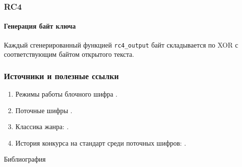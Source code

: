 \begin{frame}[fragile]
    \frametitle{RC4}
    \framesubtitle{Генерация байт ключа}

Каждый сгенерированный функцией \verb"rc4_output" байт складывается по XOR с соответствующим байтом открытого текста.
\begin{semiverbatim}
\end{semiverbatim}
\end{frame}

\appendix


\begin{frame}
\frametitle{Источники и полезные ссылки}
    \begin{enumerate}
        \item Режимы работы блочного шифра \cite{bib:mao:modernCrypto,bib:smart:crypto}. 
        \item Поточные шифры \cite{bib:smart:crypto,bib:chmora:crypto}. 
        \item Классика жанра: \cite{bib:shneir:applCrypto}. 
        \item История конкурса на стандарт среди поточных шифров: \cite{bib:misc:estream}.
    \end{enumerate}    
\end{frame}


\begin{frame}[allowframebreaks]{Библиография}
    
    
\end{frame}


